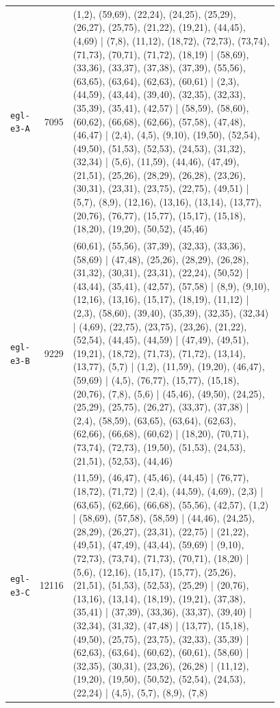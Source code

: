 \begin{landscape}
\begin{longtable}{lr>{\tiny\raggedright\arraybackslash}p{0.78\linewidth}}
\texttt{egl-e3-A} & 7095 & (1,2), (59,69), (22,24), (24,25), (25,29), (26,27), (25,75), (21,22), (19,21), (44,45), (4,69) | (7,8), (11,12), (18,72), (72,73), (73,74), (71,73), (70,71), (71,72), (18,19) | (58,69), (33,36), (33,37), (37,38), (37,39), (55,56), (63,65), (63,64), (62,63), (60,61) | (2,3), (44,59), (43,44), (39,40), (32,35), (32,33), (35,39), (35,41), (42,57) | (58,59), (58,60), (60,62), (66,68), (62,66), (57,58), (47,48), (46,47) | (2,4), (4,5), (9,10), (19,50), (52,54), (49,50), (51,53), (52,53), (24,53), (31,32), (32,34) | (5,6), (11,59), (44,46), (47,49), (21,51), (25,26), (28,29), (26,28), (23,26), (30,31), (23,31), (23,75), (22,75), (49,51) | (5,7), (8,9), (12,16), (13,16), (13,14), (13,77), (20,76), (76,77), (15,77), (15,17), (15,18), (18,20), (19,20), (50,52), (45,46) \\[2pt]
\texttt{egl-e3-B} & 9229 & (60,61), (55,56), (37,39), (32,33), (33,36), (58,69) | (47,48), (25,26), (28,29), (26,28), (31,32), (30,31), (23,31), (22,24), (50,52) | (43,44), (35,41), (42,57), (57,58) | (8,9), (9,10), (12,16), (13,16), (15,17), (18,19), (11,12) | (2,3), (58,60), (39,40), (35,39), (32,35), (32,34) | (4,69), (22,75), (23,75), (23,26), (21,22), (52,54), (44,45), (44,59) | (47,49), (49,51), (19,21), (18,72), (71,73), (71,72), (13,14), (13,77), (5,7) | (1,2), (11,59), (19,20), (46,47), (59,69) | (4,5), (76,77), (15,77), (15,18), (20,76), (7,8), (5,6) | (45,46), (49,50), (24,25), (25,29), (25,75), (26,27), (33,37), (37,38) | (2,4), (58,59), (63,65), (63,64), (62,63), (62,66), (66,68), (60,62) | (18,20), (70,71), (73,74), (72,73), (19,50), (51,53), (24,53), (21,51), (52,53), (44,46) \\[2pt]
\texttt{egl-e3-C} & 12116 & (11,59), (46,47), (45,46), (44,45) | (76,77), (18,72), (71,72) | (2,4), (44,59), (4,69), (2,3) | (63,65), (62,66), (66,68), (55,56), (42,57), (1,2) | (58,69), (57,58), (58,59) | (44,46), (24,25), (28,29), (26,27), (23,31), (22,75) | (21,22), (49,51), (47,49), (43,44), (59,69) | (9,10), (72,73), (73,74), (71,73), (70,71), (18,20) | (5,6), (12,16), (15,17), (15,77), (25,26), (21,51), (51,53), (52,53), (25,29) | (20,76), (13,16), (13,14), (18,19), (19,21), (37,38), (35,41) | (37,39), (33,36), (33,37), (39,40) | (32,34), (31,32), (47,48) | (13,77), (15,18), (49,50), (25,75), (23,75), (32,33), (35,39) | (62,63), (63,64), (60,62), (60,61), (58,60) | (32,35), (30,31), (23,26), (26,28) | (11,12), (19,20), (19,50), (50,52), (52,54), (24,53), (22,24) | (4,5), (5,7), (8,9), (7,8) \\[2pt]

\end{longtable}
\end{landscape}
